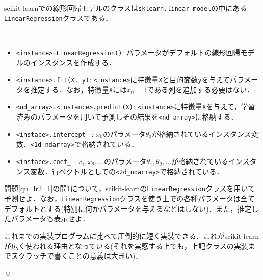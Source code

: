 scikit-learnでの線形回帰モデルのクラスは\texttt{sklearn.linear\_model}の中にある\texttt{LinearRegression}クラスである．
\begin{gram}　
\begin{itemize}
\item \texttt{<instance>=LinearRegression()}: パラメータがデフォルトの線形回帰モデルのインスタンスを作成する．
\item \texttt{<instance>.fit(X, y)}: \texttt{<instance>}に特徴量\texttt{X}と目的変数\texttt{y}を与えてパラメータを推定する．なお，特徴量\texttt{X}には$x_0=1$である列を追加する必要はない．
\item \texttt{<nd\_array>=<instance>.predict(X)}: \texttt{<instance>}に特徴量\texttt{X}を与えて，学習済みのパラメータを用いて予測しその結果を\texttt{<nd\_array>}に格納する．
\item \texttt{<instace>.intercept\_} : $x_0$のパラメータ$\theta_0$が格納されているインスタンス変数．\texttt{<1d\_ndarray>}で格納されている．
\item \texttt{<instace>.coef\_} : $x_1,x_2,\ldots$のパラメータ$\theta_1,\theta_2,\ldots$が格納されているインスタンス変数．行ベクトルとしての\texttt{<2d\_ndarray>}で格納されている．
\end{itemize}
\end{gram}

\begin{qu}
問題\ref{qu_lr2_1}の問1について，scikit-learnの\texttt{LinearRegression}クラスを用いて予測せよ．なお，\texttt{LinearRegression}クラスを使う上での各種パラメータは全てデフォルトとする(特別に何かパラメータを与えるなどはしない)．また，推定したパラメータも表示せよ．
\end{qu}
\begin{ans}
これまでの実装プログラムに比べて圧倒的に短く実装できる．これがscikit-learnが広く使われる理由となっている(それを実感する上でも，上記クラスの実装までスクラッチで書くことの意義は大きい)．
\begin{cod}[\texttt{lr15.py}]　
}]{code/lr15.py}
\vspace{-10pt}
\begin{lstlisting}
y_pred=411410.5372498779
theta_0=[89597.9095428]
theta_1,2=[[  139.21067402 -8738.01911233]]
\end{lstlisting}
\end{cod}
\vspace{-10pt}
\qed	
\end{ans}

